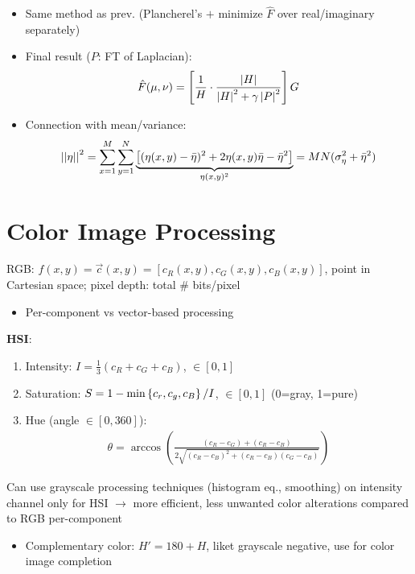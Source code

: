 \documentclass[12pt]{extarticle}
\begin{document}
\begin{itemize}
\begin{itemize}
        \item Same method as prev. (Plancherel's $+$ minimize $\hat{F}$ over real/imaginary separately)
        \item Final result ($P$: FT of Laplacian): \begin{align*}
            \hat{F}(\mu,\nu)=\left[\frac{1}{H}\cdot\frac{\left|H\right|}{\left|H\right|^2+\gamma\left|P\right|^2}\right]G
        \end{align*}
        \item Connection with mean/variance: \begin{align*}
            \left|\left|\eta\right|\right|^2=\sum_{x=1}^{M}\sum_{y=1}^N\underbrace{\left[(\eta(x,y)-\bar{\eta})^2+2\eta(x,y)\bar{\eta}-\bar{\eta}^2\right]}_{\eta(x,y)^2}=MN(\sigma^2_\eta+\bar{\eta}^2)
        \end{align*}
    \end{itemize}
\end{itemize}


\section{Color Image Processing}
RGB: $f(x,y)=\Vec{c}(x,y)=[c_R(x,y),c_G(x,y),c_B(x,y)]$, point in Cartesian space; pixel depth: total \# bits/pixel \begin{itemize}
    \item Per-component vs vector-based processing
\end{itemize}

\newp
\textbf{HSI}: \begin{enumerate}
    \item Intensity: $I=\frac{1}{3}(c_R+c_G+c_B)$, $\in[0,1]$
    \item Saturation: $S=1-\min\left\{c_r,c_g,c_B\right\}/I$, $\in[0,1]$ (0=gray, 1=pure)
    \item Hue (angle $\in[0,360]$): \begin{align*}
        \theta=\arccos\left(\frac{(c_R-c_G)+(c_R-c_B)}{2\sqrt{(c_R-c_B)^2+(c_R-c_B)(c_G-c_B)}}\right)
    \end{align*}
\end{enumerate}

\newp
Can use grayscale processing techniques (histogram eq., smoothing) on intensity channel only for HSI $\to$ more efficient, less unwanted color alterations compared to RGB per-component \begin{itemize}
    \item Complementary color: $H'=180+H$, liket grayscale negative, use for color image completion
\end{itemize}
\end{document}
